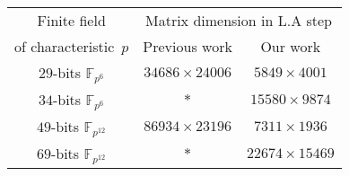 \documentclass[preview]{standalone}
\begin{document}
\begin{center}
\begin{tabular}{|c|c|c|}
                        \hline
                        Finite field & \multicolumn{2}{c|}{Matrix dimension in L.A step} \\
                        \cline{2-3}
                        of characteristic~$p$ & Previous work & Our work \\
                        \hline
                        $29$-bits $\mathbb{F}_{p^6}$ & $34686 \times 24006$ & $5849 \times 4001$ \\
                        \hline
                        $34$-bits $\mathbb{F}_{p^6}$ & $ * $ & $15580 \times 9874$ \\
                        \hline
                        $49$-bits $\mathbb{F}_{p^{12}}$ & $86934 \times 23196$ & $7311 \times 1936$ \\
                        \hline
                        $69$-bits $\mathbb{F}_{p^{12}}$ & $ * $ & $22674 \times 15469$ \\
                        \hline
                        \end{tabular}
\end{center}
\end{document}
